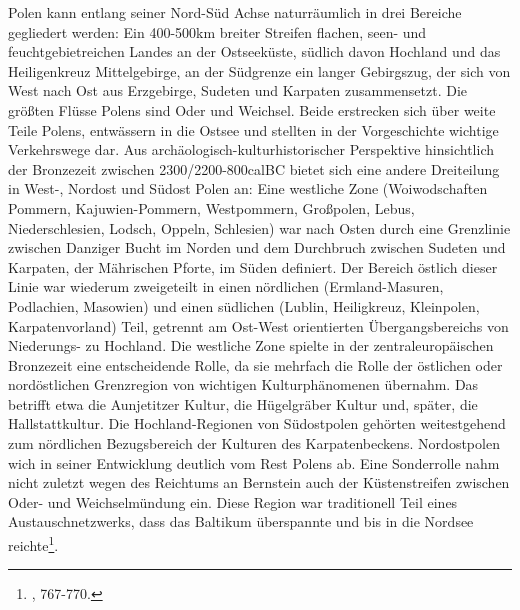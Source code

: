 \documentclass[openany,twoside,twocolumn]{book}
\let\rmarkdownfootnote\footnote%
\def\footnote{\protect\rmarkdownfootnote}
\begin{document}
Polen kann entlang seiner Nord-Süd Achse naturräumlich in drei Bereiche
gegliedert werden: Ein 400-500km breiter Streifen flachen, seen- und
feuchtgebietreichen Landes an der Ostseeküste, südlich davon Hochland
und das Heiligenkreuz Mittelgebirge, an der Südgrenze ein langer
Gebirgszug, der sich von West nach Ost aus Erzgebirge, Sudeten und
Karpaten zusammensetzt. Die größten Flüsse Polens sind Oder und
Weichsel. Beide erstrecken sich über weite Teile Polens, entwässern in
die Ostsee und stellten in der Vorgeschichte wichtige Verkehrswege dar.
Aus archäologisch-kulturhistorischer Perspektive hinsichtlich der
Bronzezeit zwischen 2300/2200-800calBC bietet sich eine andere
Dreiteilung in West-, Nordost und Südost Polen an: Eine westliche Zone
(Woiwodschaften Pommern, Kajuwien-Pommern, Westpommern, Großpolen,
Lebus, Niederschlesien, Lodsch, Oppeln, Schlesien) war nach Osten durch
eine Grenzlinie zwischen Danziger Bucht im Norden und dem Durchbruch
zwischen Sudeten und Karpaten, der Mährischen Pforte, im Süden
definiert. Der Bereich östlich dieser Linie war wiederum zweigeteilt in
einen nördlichen (Ermland-Masuren, Podlachien, Masowien) und einen
südlichen (Lublin, Heiligkreuz, Kleinpolen, Karpatenvorland) Teil,
getrennt am Ost-West orientierten Übergangsbereichs von Niederungs- zu
Hochland. Die westliche Zone spielte in der zentraleuropäischen
Bronzezeit eine entscheidende Rolle, da sie mehrfach die Rolle der
östlichen oder nordöstlichen Grenzregion von wichtigen Kulturphänomenen
übernahm. Das betrifft etwa die Aunjetitzer Kultur, die Hügelgräber
Kultur und, später, die Hallstattkultur. Die Hochland-Regionen von
Südostpolen gehörten weitestgehend zum nördlichen Bezugsbereich der
Kulturen des Karpatenbeckens. Nordostpolen wich in seiner Entwicklung
deutlich vom Rest Polens ab. Eine Sonderrolle nahm nicht zuletzt wegen
des Reichtums an Bernstein auch der Küstenstreifen zwischen Oder- und
Weichselmündung ein. Diese Region war traditionell Teil eines
Austauschnetzwerks, dass das Baltikum überspannte und bis in die Nordsee
reichte\footnote{\textcite{czebreszuk_bronze_2013}, 767-770.}.
\end{document}
